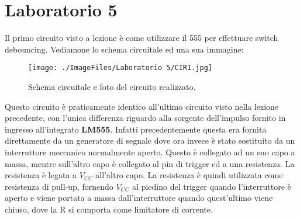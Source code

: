 \chapter{Laboratorio 5}
Il primo circuito visto a lezione è come utilizzare il 555 per effettuare switch debouncing. Vediamone lo schema circuitale ed una sua immagine:
\begin{figure}[h!]
	\centering
	\begin{minipage}{.45\textwidth}
	\end{minipage}\qquad
	\begin{minipage}{.45\textwidth}
		\texttt{[image: ./ImageFiles/Laboratorio 5/CIR1.jpg]}
	\end{minipage}
	\caption{Schema circuitale e foto del circuito realizzato.}
	\label{fig:circuito_2}
\end{figure}
Questo circuito è praticamente identico all'ultimo circuito visto nella lezione precedente, con l'unica differenza riguardo alla sorgente dell'impulso fornito in ingresso all'integrato \textbf{LM555}. Infatti precedentemente questa era fornita direttamente da un generatore di segnale dove ora invece è stato sostituito da un interruttore meccanico normalmente aperto. Questo è collegato ad un suo capo a massa, mentre sull'altro capo è collegato al pin di trigger ed a una resistenza. La resistenza è legata a $V_{CC}$ all'altro capo. La resistenza è quindi utilizzata come resistenza di pull-up, fornendo $V_{CC}$ al piedino del trigger quando l'interruttore è aperto e viene portata a massa dall'interruttore quando quest'ultimo viene chiuso, dove la R si comporta come limitatore di corrente.

